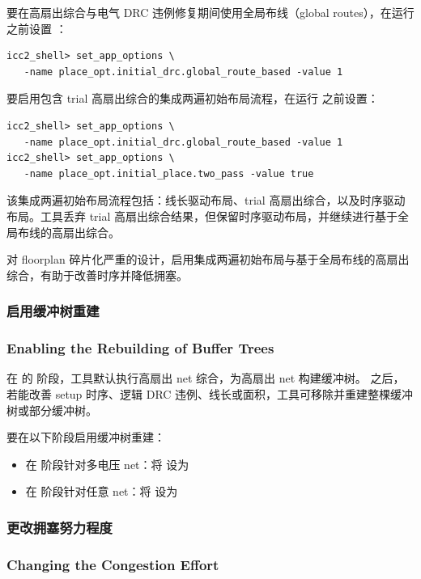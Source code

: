 要在高扇出综合与电气 DRC 违例修复期间使用全局布线（global routes），在运行  之前设置 ：
\begin{lstlisting}
icc2_shell> set_app_options \
   -name place_opt.initial_drc.global_route_based -value 1
\end{lstlisting}

要启用包含 trial 高扇出综合的集成两遍初始布局流程，在运行  之前设置：
\begin{lstlisting}
icc2_shell> set_app_options \
   -name place_opt.initial_drc.global_route_based -value 1
icc2_shell> set_app_options \
   -name place_opt.initial_place.two_pass -value true
\end{lstlisting}

该集成两遍初始布局流程包括：线长驱动布局、trial 高扇出综合，以及时序驱动布局。工具丢弃 trial 高扇出综合结果，但保留时序驱动布局，并继续进行基于全局布线的高扇出综合。

对 floorplan 碎片化严重的设计，启用集成两遍初始布局与基于全局布线的高扇出综合，有助于改善时序并降低拥塞。

\subsubsection{启用缓冲树重建}
\subsubsection*{Enabling the Rebuilding of Buffer Trees}

在 \cmd{place\_opt} 的  阶段，工具默认执行高扇出 net 综合，为高扇出 net 构建缓冲树。 之后，若能改善 setup 时序、逻辑 DRC 违例、线长或面积，工具可移除并重建整棵缓冲树或部分缓冲树。

要在以下阶段启用缓冲树重建：
\begin{itemize}
  \item 在  阶段针对多电压 net：将  设为 
  \item 在  阶段针对任意 net：将  设为 
\end{itemize}

\subsubsection{更改拥塞努力程度}
\subsubsection*{Changing the Congestion Effort}

